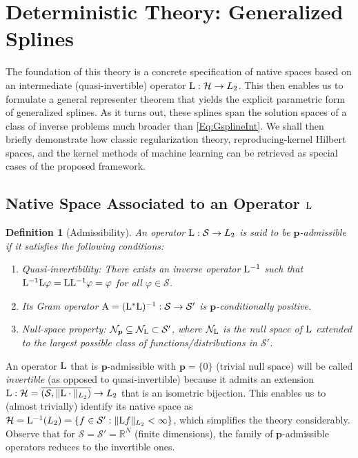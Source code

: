 \documentclass[11pt, english,english]{article}
\newtheorem{definition}{Definition}
\newcommand{\R}{ \mathbb{R}}
\newcommand{\Lop}{{\rm L}}
\def\V#1{{\boldsymbol{#1}}}         %
\def\Spc#1{{\mathcal{#1}}}  %
\def\Op#1{{\mathrm{#1}}}  %
\renewcommand{\[}{\begin{equation}}
\renewcommand{\]}[1]{\label{eq:#1}\end{equation}}
\begin{document}
\section{Deterministic Theory: Generalized Splines}
\label{Sec:Deterministic}
The foundation of this theory is a concrete specification of native spaces based on an intermediate (quasi-invertible) operator $\Lop: \Spc H \to L_2$.
This then enables us to formulate a general representer theorem that yields the explicit parametric form of generalized splines.
As it turns out, these splines span the solution spaces of a class of inverse problems much broader than \eqref{Eq:GsplineInt}. We shall then briefly demonstrate how classic regularization theory, reproducing-kernel Hilbert spaces, and the kernel methods of machine learning can be retrieved as special cases of the proposed framework.
\subsection{Native Space Associated to an Operator $\Lop$}
\label{Sec:NativeSpaces}
\begin{definition}[Admissibility]
\label{Def:pAdmissibility}
An operator $\Lop: \Spc S \to L_2$ is said to be $\V p$-admissible if it satisfies the following conditions:
\begin{enumerate}
\item Quasi-invertibility: There exists an inverse operator $\Lop^{-1}$ such that $\Lop^{-1}\Lop \varphi=\Lop\Lop^{-1}\varphi=\varphi$ for all $\varphi \in \Spc S$.
\item Its Gram operator $\Op A=(\Lop^\ast\Lop)^{-1}: \Spc S \to \Spc S'$ is $\V p$-conditionally positive.
\item Null-space property: $\Spc N_{\V p}\subseteq \Spc N_\Lop\subset \Spc S'$, where $\Spc N_\Lop$ is the null space of $\Lop$ extended to the largest possible class of functions/distributions in $\Spc S'$.
\end{enumerate}
\end{definition}
An operator $\Lop$ that is $\V p$-admissible with $\V p=\{0\}$ (trivial null space) will be called {\em invertible} (as opposed to quasi-invertible)
because it admits an extension $\Lop: \Spc H=\overline{(\Spc S,\|\Lop \cdot\|_{L_2})} \to L_2$ that is an isometric bijection. This enables us to (almost trivially) identify its native space as $\Spc H=\Lop^{-1}(L_2)=\{f \in \Spc S': \|\Lop f\|_{L_2}<\infty\}$, which  simplifies the theory considerably.
Observe that for $\Spc S=\Spc S'=\R^N$ (finite dimensions), the family of $\V p$-admissible operators reduces to the invertible ones.
\end{document}
